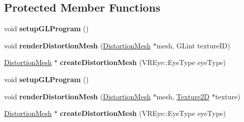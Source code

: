 \subsection*{Protected Member Functions}
\begin{DoxyCompactItemize}
\item 
\mbox{\label{classVRGenericRenderer_a28e8b194c13dfbb4a6211cbe8818c63b}} 
void {\bfseries setup\+G\+L\+Program} ()
\item 
\mbox{\label{classVRGenericRenderer_a96c401ee5df8ba1ae437406cc1e76727}} 
void {\bfseries render\+Distortion\+Mesh} (\hyperlink{classDistortionMesh}{Distortion\+Mesh} $\ast$mesh, G\+Lint texture\+ID)
\item 
\mbox{\label{classVRGenericRenderer_a7aba309703ee1aafeedcbf68d4cd7367}} 
\hyperlink{classDistortionMesh}{Distortion\+Mesh} $\ast$ {\bfseries create\+Distortion\+Mesh} (V\+R\+Eye\+::\+Eye\+Type eye\+Type)
\item 
\mbox{\label{classVRGenericRenderer_a28e8b194c13dfbb4a6211cbe8818c63b}} 
void {\bfseries setup\+G\+L\+Program} ()
\item 
\mbox{\label{classVRGenericRenderer_a3d14cc73845f5e282496d3706b530d71}} 
void {\bfseries render\+Distortion\+Mesh} (\hyperlink{classDistortionMesh}{Distortion\+Mesh} $\ast$mesh, \hyperlink{classTexture2D}{Texture2D} $\ast$texture)
\item 
\mbox{\label{classVRGenericRenderer_a50cc7a01f73d52b714a0cee81e211cc2}} 
\hyperlink{classDistortionMesh}{Distortion\+Mesh} $\ast$ {\bfseries create\+Distortion\+Mesh} (V\+R\+Eye\+::\+Eye\+Type eye\+Type)
\end{DoxyCompactItemize}
